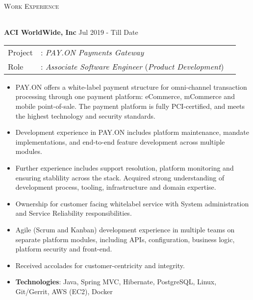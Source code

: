 \documentclass[a4paper]{article}
\newcommand{\lineunder} {
    \vspace*{-8pt} \\
    \hspace*{-18pt} \hrulefill \\
}
\newcommand{\header} [1] {
    {\hspace*{-18pt}\vspace*{6pt} \textsc{#1}}
    \vspace*{-6pt} \lineunder
}
\begin{document}
\header{Work Experience}
\vspace{1mm}

\textbf{ACI WorldWide, Inc} \hfill Jul 2019 - Till Date\\
\begin{tabular}{ l l l }
Project & : \textit{PAY.ON Payments Gateway} \\
Role & : \textit{Associate Software Engineer} (\textit{Product Development}) \\
\end{tabular}
\vspace{-1mm}
\begin{itemize} \itemsep 1pt
	\item PAY.ON offers a white-label payment structure for omni-channel transaction processing through one payment platform: eCommerce, mCommerce and mobile point-of-sale. The payment platform is fully PCI-certified, and meets the highest technology and security standards.
	\item Development experience in PAY.ON includes platform maintenance, mandate implementations, and end-to-end feature development across multiple modules.
  \item Further experience includes support resolution, platform monitoring and ensuring stablility across the stack. Acquired strong understanding of development process, tooling, infrastructure and domain expertise.
  \item Ownership for customer facing whitelabel service with System administration and Service Reliability responsibilities.
  \item Agile (Scrum and Kanban) development experience in multiple teams on separate platform modules, including APIs, configuration, business logic, platform security and front-end.
  \item Received accolades for customer-centricity and integrity.
	\item \textbf{Technologies}: Java, Spring MVC, Hibernate, PostgreSQL, Linux, Git/Gerrit, AWS (EC2), Docker
\end{itemize}
\end{document}
